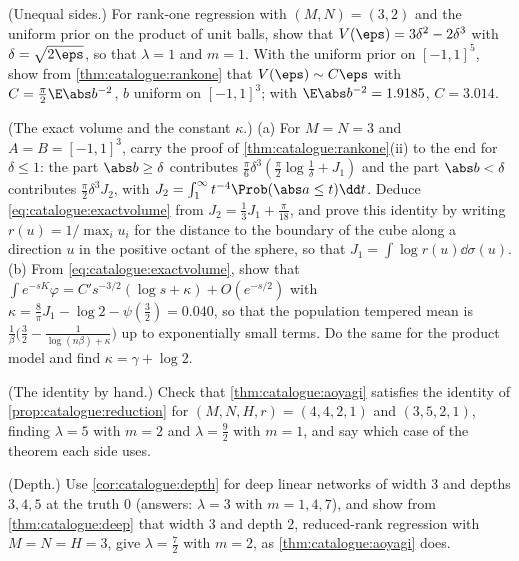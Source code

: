 \begin{refsection}
\begin{exercises}
\item \consolidation (Unequal sides.)\label{ex:catalogue:unequal} For rank-one regression with $(M,N)=(3,2)$ and the uniform prior on the product of unit balls, show that $V(\eps)=3\delta^2-2\delta^3$ with $\delta=\sqrt{2\eps}$, so that $\lambda=1$ and $m=1$. With the uniform prior on $[-1,1]^5$, show from \cref{thm:catalogue:rankone} that $V(\eps)\sim C\eps$ with $C=\frac\pi2\E\abs b^{-2}$, $b$ uniform on $[-1,1]^3$; with $\E\abs b^{-2}=1.9185$, $C=3.014$.

\item \consolidation (The exact volume and the constant $\kappa$.)\label{ex:catalogue:exactvolume} (a) For $M=N=3$ and $A=B=[-1,1]^3$, carry the proof of \cref{thm:catalogue:rankone}(ii) to the end for $\delta\le1$: the part $\abs b\ge\delta$ contributes $\frac\pi6\delta^3(\frac\pi2\log\frac1\delta+J_1)$ and the part $\abs b<\delta$ contributes $\frac\pi2\delta^3J_2$, with $J_2=\int_1^\infty t^{-4}\Prob(\abs a\le t)\dd t$. Deduce \eqref{eq:catalogue:exactvolume} from $J_2=\frac13J_1+\frac\pi{18}$, and prove this identity by writing $r(u)=1/\max_iu_i$ for the distance to the boundary of the cube along a direction $u$ in the positive octant of the sphere, so that $J_1=\int\log r(u)\dd\sigma(u)$. (b) From \eqref{eq:catalogue:exactvolume}, show that $\int e^{-sK}\varphi=C's^{-3/2}(\log s+\kappa)+O(e^{-s/2})$ with $\kappa=\frac8\pi J_1-\log2-\psi(\frac32)=0.040$, so that the population tempered mean is $\frac1\beta\bigl(\frac32-\frac1{\log(n\beta)+\kappa}\bigr)$ up to exponentially small terms. Do the same for the product model and find $\kappa=\gamma+\log2$.

\item \consolidation (The identity by hand.)\label{ex:catalogue:reduction} Check that \cref{thm:catalogue:aoyagi} satisfies the identity of \cref{prop:catalogue:reduction} for $(M,N,H,r)=(4,4,2,1)$ and $(3,5,2,1)$, finding $\lambda=5$ with $m=2$ and $\lambda=\frac92$ with $m=1$, and say which case of the theorem each side uses.

\item \consolidation (Depth.)\label{ex:catalogue:depth} Use \cref{cor:catalogue:depth} for deep linear networks of width $3$ and depths $3,4,5$ at the truth $0$ (answers: $\lambda=3$ with $m=1,4,7$), and show from \cref{thm:catalogue:deep} that width $3$ and depth $2$, reduced-rank regression with $M=N=H=3$, give $\lambda=\frac72$ with $m=2$, as \cref{thm:catalogue:aoyagi} does.


\end{exercises}
\end{refsection}
